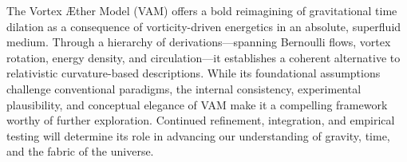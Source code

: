 The Vortex Æther Model (VAM) offers a bold reimagining of gravitational time dilation as a consequence of vorticity-driven energetics in an absolute, superfluid medium. Through a hierarchy of derivations—spanning Bernoulli flows, vortex rotation, energy density, and circulation—it establishes a coherent alternative to relativistic curvature-based descriptions. While its foundational assumptions challenge conventional paradigms, the internal consistency, experimental plausibility, and conceptual elegance of VAM make it a compelling framework worthy of further exploration. Continued refinement, integration, and empirical testing will determine its role in advancing our understanding of gravity, time, and the fabric of the universe.